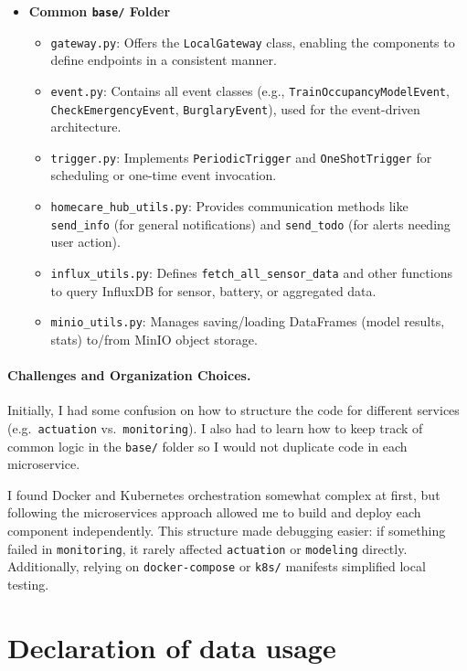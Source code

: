 \documentclass[A4,10pt]{article}
\begin{document}
\begin{itemize}
  \item \textbf{Common \texttt{base/} Folder}
  \begin{itemize}
    \item \texttt{gateway.py}: Offers the \texttt{LocalGateway} class, enabling the components to define 
      endpoints in a consistent manner.
    \item \texttt{event.py}: Contains all event classes (e.g., \texttt{TrainOccupancyModelEvent}, 
      \texttt{CheckEmergencyEvent}, \texttt{BurglaryEvent}), used for the event-driven architecture.
    \item \texttt{trigger.py}: Implements \texttt{PeriodicTrigger} and \texttt{OneShotTrigger} for scheduling 
      or one-time event invocation.
    \item \texttt{homecare\_hub\_utils.py}: Provides communication methods like \texttt{send\_info} 
      (for general notifications) and \texttt{send\_todo} (for alerts needing user action).
    \item \texttt{influx\_utils.py}: Defines \texttt{fetch\_all\_sensor\_data} and other functions to 
      query InfluxDB for sensor, battery, or aggregated data.
    \item \texttt{minio\_utils.py}: Manages saving/loading DataFrames (model results, stats) to/from MinIO object storage.
  \end{itemize}
\end{itemize}

\paragraph{Challenges and Organization Choices.}
Initially, I had some confusion on how to structure the code for different services (e.g.\ 
\texttt{actuation} vs.\ \texttt{monitoring}). I also had to learn how to keep track of
common logic in the \texttt{base/} folder so I would not duplicate code in each microservice. 

I found Docker and Kubernetes orchestration somewhat complex at first, but following 
the microservices approach allowed me to build and deploy each component independently. 
This structure made debugging easier: if something failed in \texttt{monitoring}, it rarely 
affected \texttt{actuation} or \texttt{modeling} directly. Additionally, relying on 
\texttt{docker-compose} or \texttt{k8s/} manifests simplified local testing.

\section{Declaration of data usage}
\end{document}
